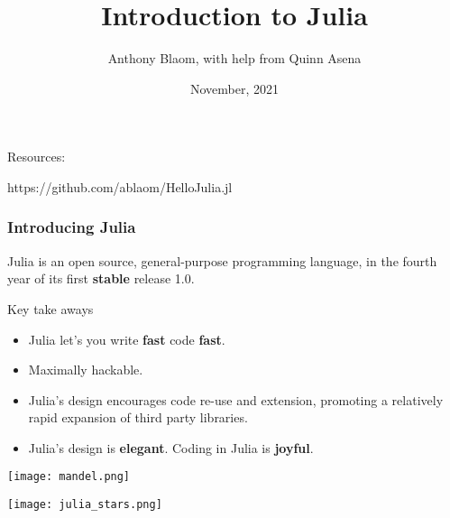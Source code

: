 \documentclass[t]{beamer}
\title{\color{Maroon} Introduction to Julia}
\date{November, 2021}
\author{Anthony Blaom, with help from Quinn Asena}
\newcommand\df{\bf\color{Maroon}}
\begin{document}



\begin{frame}
        \titlepage
\end{frame}

\begin{frame}
  Resources:
  \begin{center}
  {\huge https://github.com/ablaom/HelloJulia.jl}
  \end{center}
\end{frame}

\begin{frame}
  \frametitle{Introducing Julia}
  Julia is an open source, general-purpose programming language, in
  the fourth year of its first {\df stable} release 1.0.\pause

  \begin{block}{Key take aways}
    \begin{itemize}
    \item Julia let's you write {\df fast}
      code {\df fast}.\pause
    \item Maximally hackable.\pause
    \item Julia's design encourages code re-use and extension,
      promoting a relatively rapid expansion of third party libraries.\pause
  \item Julia's design is {\df elegant}. Coding in Julia is {\df joyful}.
  \end{itemize}
  \end{block}
\end{frame}

\begin{frame}[plain]
     \texttt{[image: mandel.png]}
\end{frame}

\begin{frame}[plain]
     \texttt{[image: julia\_stars.png]}
\end{frame}
\end{document}
